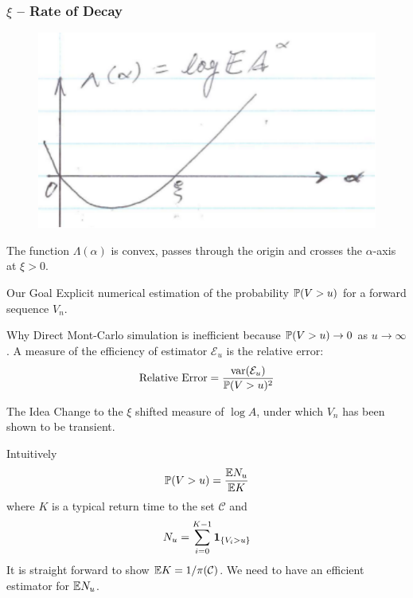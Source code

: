 \documentclass{beamer}
\begin{document}
\begin{frame}
  \frametitle{$\xi$ -- Rate of Decay}
  \begin{figure}[htb!]
    \centering
    \includegraphics[scale=0.8]{pic2.pdf}
  \end{figure}
  The function $\Lambda(\alpha)$ is convex, passes through the origin
  and crosses the $\alpha$-axis at $\xi > 0$.
\end{frame}

\begin{frame}
  \begin{exampleblock}{Our Goal}
    Explicit numerical estimation of the probability $\P(V > u)$ for a
    forward sequence $V_n$.
  \end{exampleblock}
  \begin{exampleblock}{Why}
    Direct Mont-Carlo simulation is inefficient because
    $\P(V > u) \to 0$ as $u \to \infty$. A measure of the efficiency
    of estimator $\mathcal E_u$ is the relative error:
    \[
    \text{Relative Error} = {
      \var(\mathcal E_u)
      \over
      \P(V > u)^2
    }
    \]
  \end{exampleblock}
  \begin{exampleblock}{The Idea}
    Change to the $\xi$ shifted measure of $\log A$, under which $V_n$ has
    been shown to be transient.
  \end{exampleblock}
\end{frame}

\begin{frame}
  Intuitively
  \[
  \P(V > u) = {
    \E N_u
    \over
    \E K
  }
  \]
  where $K$ is a typical return time to the set $\mathcal C$ and
  \[
  N_u = \sum_{i=0}^{K - 1} \1{V_i > u}
  \]
  It is straight forward to show $\E K = 1/\pi(\mathcal C)$. We need to
  have an efficient estimator for $\E N_u$.
\end{frame}
\end{document}
